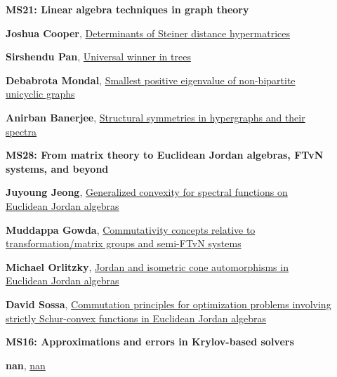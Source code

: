 \documentclass[ILAS2025-program.tex]{subfiles}
\begin{document}
\begin{description}
    \begin{description}
    \item[] {\color{mstitle}\textbf{MS21: Linear algebra techniques in graph theory}} 
    \item[] \hypertarget{up0379}{}\textbf{Joshua Cooper}, \hyperlink{down0379}{Determinants of Steiner distance hypermatrices}
        \item[] \hypertarget{up0380}{}\textbf{Sirshendu Pan}, \hyperlink{down0380}{Universal winner in trees}
        \item[] \hypertarget{up0381}{}\textbf{Debabrota Mondal}, \hyperlink{down0381}{Smallest positive eigenvalue of non-bipartite unicyclic graphs}
        \item[] \hypertarget{up0382}{}\textbf{Anirban Banerjee}, \hyperlink{down0382}{Structural symmetries in hypergraphs and their spectra}
        \end{description}
    \begin{description}
    \item[] {\color{mstitle}\textbf{MS28: From matrix theory to Euclidean Jordan algebras, FTvN systems, and beyond}} 
    \item[] \hypertarget{up0383}{}\textbf{Juyoung Jeong}, \hyperlink{down0383}{Generalized convexity for spectral functions on Euclidean Jordan algebras
}
        \item[] \hypertarget{up0384}{}\textbf{Muddappa Gowda}, \hyperlink{down0384}{Commutativity concepts relative to transformation/matrix groups and semi-FTvN systems}
        \item[] \hypertarget{up0385}{}\textbf{Michael Orlitzky}, \hyperlink{down0385}{Jordan and isometric cone automorphisms in Euclidean Jordan algebras}
        \item[] \hypertarget{up0386}{}\textbf{David Sossa}, \hyperlink{down0386}{Commutation principles for optimization problems involving strictly Schur-convex functions in Euclidean Jordan algebras
}
        \end{description}
    \begin{description}
    \item[] {\color{mstitle}\textbf{MS16: Approximations and errors in Krylov-based solvers}} 
    \item[] \hypertarget{up0387}{}\textbf{nan}, \hyperlink{down0387}{nan}

\end{description}
\end{description}
\end{document}

